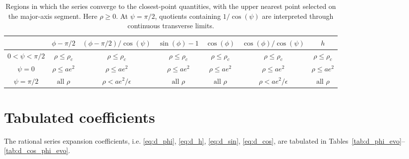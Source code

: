 \documentclass[a4paper]{amsart}
\begin{document}
\begin{table}[ht]
\centering
\caption{Regions in which the series converge to the closest-point quantities, with the upper nearest point selected on the major-axis segment. Here $\rho\geq0$. At $\psi=\pi/2$, quotients containing $1/\cos(\psi)$ are interpreted through continuous transverse limits. %
}
\small
\setlength{\tabcolsep}{4pt}
\label{tab:closest_point_validity}
\begin{tabular}{c|c|c|c|c|c|c}
\hline
& $\phi-\pi/2$
& $(\phi\!-\!\pi/2)/\!\cos(\psi)$
& $\sin(\phi)\!-\!1$
& $\cos(\phi)$
& $\cos(\phi)/\!\cos(\psi)$
& $h$ \\
\hline
$0\!<\!\psi\!<\!\pi/2$
& $\rho\leq\rho_c$
& $\rho\leq\rho_c$
& $\rho\leq\rho_c$
& $\rho\leq\rho_c$
& $\rho\leq\rho_c$
& $\rho\leq\rho_c$
\\[1mm]
$\psi=0$
& $\rho\leq ae^2$
& $\rho\leq ae^2$
& $\rho\leq ae^2$
& $\rho\leq ae^2$
& $\rho\leq ae^2$
& $\rho\leq ae^2$
\\[1mm]
$\psi=\pi/2$
& $\text{all }\rho$
& $\rho<ae^2/\epsilon$
& $\text{all }\rho$
& $\text{all }\rho$
& $\rho<ae^2/\epsilon$
& $\text{all }\rho$
\\
\hline
\end{tabular}
\end{table}


\newpage
\section{Tabulated coefficients}\label{sec::tabulated_coefficients}
The rational series expansion coefficients, i.e. \eqref{eq:d_phi}, \eqref{eq:d_h}, \eqref{eq:d_sin}, \eqref{eq:d_cos}, are tabulated in Tables~\ref{tab:d_phi_evo}--\ref{tab:d_cos_phi_evo}. %





\end{document}
